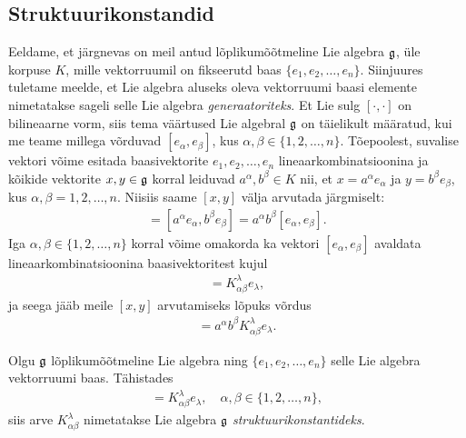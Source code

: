 \subsection{Struktuurikonstandid}

Eeldame, et järgnevas on meil antud lõplikumõõtmeline Lie algebra $\mathfrak{g}$,
üle korpuse $K$, mille vektorruumil on fikseerutd baas
$\{ e_1, e_2, \dots, e_n \}$. Siinjuures tuletame meelde, et Lie algebra
aluseks oleva vektorruumi baasi elemente nimetatakse sageli selle
Lie algebra \emph{generaatoriteks}. Et Lie sulg
$[\cdot, \cdot]$ on bilineaarne vorm, siis tema väärtused Lie algebral
$\mathfrak{g}$ on täielikult määratud, kui me teame millega võrduvad
$[e_\alpha, e_\beta]$, kus $\alpha, \beta \in \{1, 2, \dots, n\}$.
Tõepoolest, suvalise vektori võime esitada baasivektorite
$e_1, e_2, \dots, e_n$ lineaarkombinatsioonina ja kõikide vektorite
$x, y \in \mathfrak{g}$ korral leiduvad $a^\alpha, b^\beta \in K$ nii, et
$x = a^\alpha e_\alpha$ ja $y = b^\beta e_\beta$, kus
$\alpha, \beta = 1, 2, \dots, n$. Niisiis saame $[x, y]$ välja arvutada
järgmiselt:
\begin{align*}
    [x, y] = [a^\alpha e_\alpha, b^\beta e_\beta] =
    a^\alpha b^\beta [e_\alpha, e_\beta].
\end{align*}
Iga $\alpha, \beta \in \{1, 2, \dots, n\}$ korral võime omakorda ka
vektori $[e_\alpha, e_\beta]$ avaldata lineaarkombinatsioonina
baasivektoritest kujul
\begin{align*}
    [e_\alpha, e_\beta] = K_{\alpha \beta}^{\lambda} e_\lambda,
\end{align*}
ja seega jääb meile $[x, y]$ arvutamiseks lõpuks võrdus
\begin{align*}
    [x, y] = a^\alpha b^\beta K_{\alpha \beta}^{\lambda} e_\lambda.
\end{align*}

\begin{dfn}
    Olgu $\mathfrak{g}$ lõplikumõõtmeline Lie algebra ning $\{ e_1, e_2, \dots, e_n \}$
    selle Lie algebra vektorruumi baas. Tähistades
    \begin{align*}
        [e_\alpha, e_\beta] = K_{\alpha \beta}^{\lambda} e_\lambda, \quad
        \alpha, \beta \in \{1, 2, \dots, n\},
    \end{align*}
    siis arve $K_{\alpha \beta}^{\lambda}$ nimetatakse Lie algebra $\mathfrak{g}$
    \emph{struktuurikonstantideks}.
\end{dfn}

